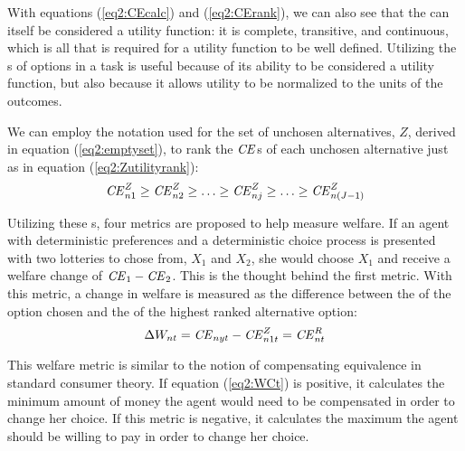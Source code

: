 \documentclass[../main.tex]{subfiles}
\begin{document}
\addtocounter{footnote}{-1}

With equations (\ref{eq2:CEcalc}) and (\ref{eq2:CErank}), we can also see that the {\CE} can itself be considered a utility function: it is complete, transitive, and continuous, which is all that is required for a utility function to be well defined.
Utilizing the {\CE}s of options in a task is useful because of its ability to be considered a utility function, but also because it allows utility to be normalized to the units of the outcomes.

We can employ the notation used for the set of unchosen alternatives, $Z$, derived in equation (\ref{eq2:emptyset}), to rank the ${\mathit{CE}}$s of each unchosen alternative just as in equation (\ref{eq2:Zutilityrank}):
\begin{equation}
	\label{eq2:CEZ}
	{\ensuremath{\mathit{CE}}}_{n1}^Z \geq {\ensuremath{\mathit{CE}}}_{n2}^Z \geq \ldots \geq {\ensuremath{\mathit{CE}}}_{nj}^Z \geq \ldots \geq {\ensuremath{\mathit{CE}}}_{n(J-1)}^Z 
\end{equation}

Utilizing these {\CE}s, four metrics are proposed to help measure welfare.
If an agent with deterministic preferences and a deterministic choice process is presented with two lotteries to chose from, $X_1$ and $X_2$, she would choose $X_1$ and receive a welfare change of ${\mathit{CE}}_1 - {\mathit{CE}}_2$.
This is the thought behind the first metric.
With this metric, a change in welfare is measured as the difference between the {\CE} of the option chosen and the {\CE} of the highest ranked alternative option:
\begin{equation}
	\label{eq2:WCt}
	\Delta W_{nt} = {\mathit{CE}}_{nyt} - {\mathit{CE}}_{n1t}^Z = {\mathit{CE}}_{nt}^R
\end{equation}

This welfare metric is similar to the notion of compensating equivalence in standard consumer theory.
If equation (\ref{eq2:WCt}) is positive, it calculates the minimum amount of money the agent would need to be compensated in order to change her choice.
If this metric is negative, it calculates the maximum the agent should be willing to pay in order to change her choice.
\end{document}
